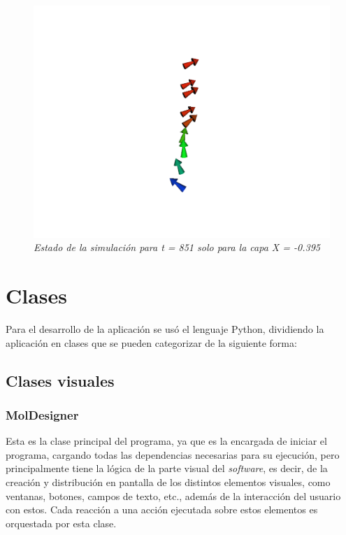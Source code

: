 \begin{figure}[H]
  \centering
  \includegraphics[scale=.3]{images/softwareVisualizacionVectorsX}
  \caption{\em Estado de la simulación para t = 851 solo para la capa X = -0.395}
\end{figure}



\section{Clases}

Para el desarrollo de la aplicación se usó el lenguaje Python, dividiendo la aplicación en clases que se pueden categorizar de la siguiente forma:

\subsection{Clases visuales}

\subsubsection{MolDesigner}
Esta es la clase principal del programa, ya que es la encargada de iniciar el programa, cargando todas las dependencias necesarias para su ejecución, pero principalmente tiene la lógica de la parte visual del \emph{software}, es decir, de la creación y distribución en pantalla de los distintos elementos visuales, como ventanas, botones, campos de texto, etc., además de la interacción del usuario con estos. Cada reacción a una acción ejecutada sobre estos elementos es orquestada por esta clase.

